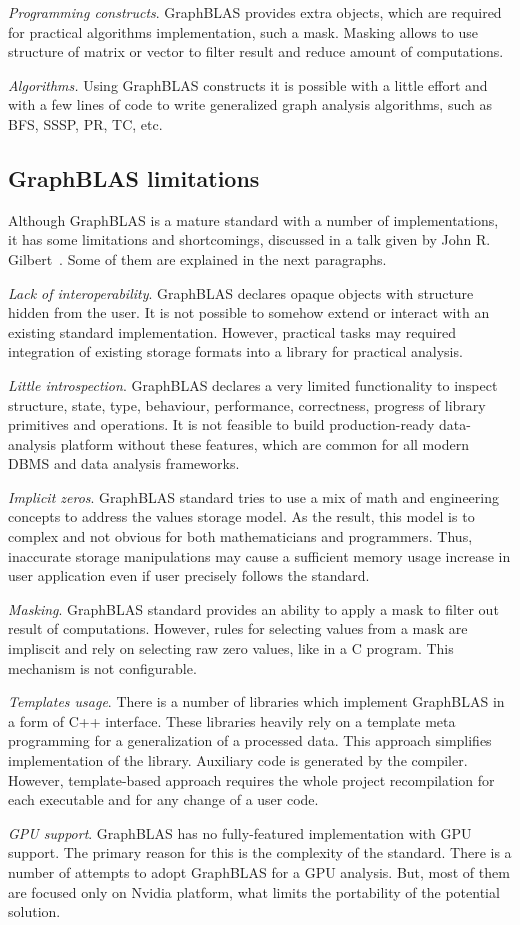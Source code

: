 \textit{Programming constructs}. GraphBLAS provides extra objects, which are required for practical algorithms implementation, such a mask. Masking allows to use structure of matrix or vector to filter result and reduce amount of computations.

\textit{Algorithms.} Using GraphBLAS constructs it is possible with a little effort and with a few lines of code to write generalized graph analysis algorithms, such as BFS, SSSP, PR, TC, etc.

\subsection{GraphBLAS limitations}

Although GraphBLAS is a mature standard with a number of implementations, it has some limitations and shortcomings, discussed in a talk given by John R. Gilbert~\cite{talk:graphblas_did_wrong}. Some of them are explained in the next paragraphs. 

\textit{Lack of interoperability}. GraphBLAS declares opaque objects with structure hidden from the user. It is not possible to somehow extend or interact with an existing standard implementation. However, practical tasks may required integration of existing storage formats into a library for practical analysis. 

\textit{Little introspection}. GraphBLAS declares a very limited functionality to inspect structure, state, type, behaviour, performance, correctness, progress of library primitives and operations. It is not feasible to build production-ready data-analysis platform without these features, which are common for all modern DBMS and data analysis frameworks.

\textit{Implicit zeros}. GraphBLAS standard tries to use a mix of math and engineering concepts to address the values storage model. As the result, this model is to complex and not obvious for both mathematicians and programmers. Thus, inaccurate storage manipulations may cause a sufficient memory usage increase in user application even if user precisely follows the standard.

\textit{Masking}. GraphBLAS standard provides an ability to apply a mask to filter out result of computations. However, rules for selecting values from a mask are impliscit and rely on selecting raw zero values, like in a C program. This mechanism is not configurable.

\textit{Templates usage}. There is a number of libraries which implement GraphBLAS in a form of C++ interface. These libraries heavily rely on a template meta programming for a generalization of a processed data. This approach simplifies implementation of the library. Auxiliary code is generated by the compiler. However, template-based approach requires the whole project recompilation for each executable and for any change of a user code.

\textit{GPU support}. GraphBLAS has no fully-featured implementation with GPU support. The primary reason for this is the complexity of the standard. There is a number of attempts to adopt GraphBLAS for a GPU analysis. But, most of them are focused only on Nvidia platform, what limits the portability of the potential solution.